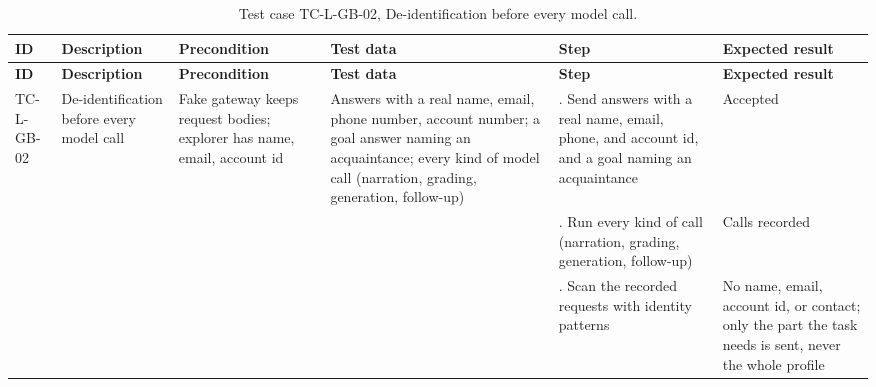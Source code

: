 {\footnotesize{}\renewcommand{\arraystretch}{1.1}
\begin{longtable}{|>{\raggedright\arraybackslash}p{}|>{\raggedright\arraybackslash}p{}|>{\raggedright\arraybackslash}p{}|>{\raggedright\arraybackslash}p{}|>{\raggedright\arraybackslash}p{}|>{\raggedright\arraybackslash}p{}|}
\caption{Test case TC-L-GB-02, De-\allowbreak{}identification before every model call.} \\
\hline
\textbf{ID} & \textbf{Description} & \textbf{Precondition} & \textbf{Test data} & \textbf{Step} & \textbf{Expected result} \\ \hline
\endfirsthead
\hline
\textbf{ID} & \textbf{Description} & \textbf{Precondition} & \textbf{Test data} & \textbf{Step} & \textbf{Expected result} \\ \hline
\endhead
TC-L-GB-02 & De-\allowbreak{}identification before every model call & Fake gateway keeps request bodies; explorer has name, email, account id & Answers with a real name, email, phone number, account number; a goal answer naming an acquaintance; every kind of model call (narration, grading, generation, follow-up) & 1. Send answers with a real name, email, phone, and account id, and a goal naming an acquaintance & Accepted \\ \cline{5-6}
 &  &  &  & 2. Run every kind of call (narration, grading, generation, follow-up) & Calls recorded \\ \cline{5-6}
 &  &  &  & 3. Scan the recorded requests with identity patterns & No name, email, account id, or contact; only the part the task needs is sent, never the whole profile \\ \hline
\end{longtable}
}

